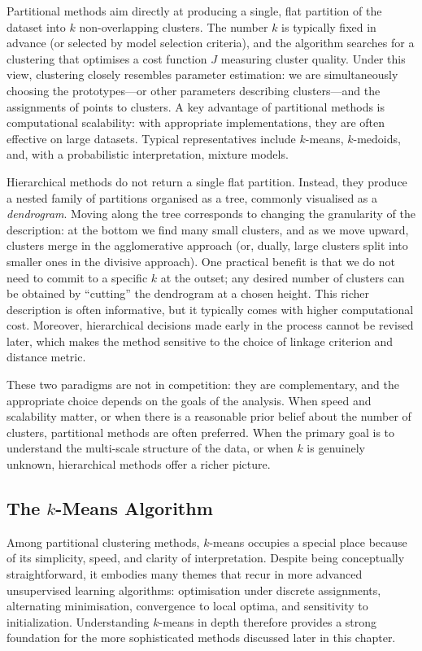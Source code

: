 Partitional methods aim directly at producing a single, flat partition of the dataset into $k$
non-overlapping clusters. The number $k$ is typically fixed in advance (or selected by
model selection criteria), and the algorithm searches for a clustering that optimises a cost
function $J$ measuring cluster quality. Under this view, clustering closely resembles
parameter estimation: we are simultaneously choosing the prototypes---or other parameters
describing clusters---and the assignments of points to clusters. A key advantage of
partitional methods is computational scalability: with appropriate implementations, they are
often effective on large datasets. Typical representatives include $k$-means, $k$-medoids,
and, with a probabilistic interpretation, mixture models.

Hierarchical methods do not return a single flat partition. Instead, they produce a nested
family of partitions organised as a tree, commonly visualised as a \emph{dendrogram}.
Moving along the tree corresponds to changing the granularity of the description: at the
bottom we find many small clusters, and as we move upward, clusters merge in the
agglomerative approach (or, dually, large clusters split into smaller ones in the divisive
approach). One practical benefit is that we do not need to commit to a specific $k$ at the
outset; any desired number of clusters can be obtained by ``cutting'' the dendrogram at a
chosen height. This richer description is often informative, but it typically comes with
higher computational cost. Moreover, hierarchical decisions made early in the process
cannot be revised later, which makes the method sensitive to the choice of linkage criterion
and distance metric.

These two paradigms are not in competition: they are complementary, and the appropriate
choice depends on the goals of the analysis. When speed and scalability matter, or when
there is a reasonable prior belief about the number of clusters, partitional methods are
often preferred. When the primary goal is to understand the multi-scale structure of the
data, or when $k$ is genuinely unknown, hierarchical methods offer a richer picture.

\subsection*{The $k$-Means Algorithm}

Among partitional clustering methods, $k$-means occupies a special place because of its
simplicity, speed, and clarity of interpretation. Despite being conceptually straightforward,
it embodies many themes that recur in more advanced unsupervised learning algorithms:
optimisation under discrete assignments, alternating minimisation, convergence to local
optima, and sensitivity to initialization. Understanding $k$-means in depth therefore
provides a strong foundation for the more sophisticated methods discussed later in this
chapter.

